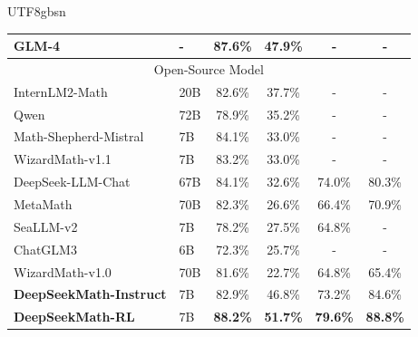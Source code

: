 \documentclass[11pt, a4paper, logo, copyright, nonumbering]{deepseek}
\newcommand{\spmath}{DeepSeekMath}
\begin{document}
\begin{CJK*}{UTF8}{gbsn}
\begin{table}[t!]
{\begin{tabular}{llcccc}
GLM-4 &           -            & 87.6\%                         & 47.9\%               &            -          &       -                                                          \\
\midrule
\multicolumn{6}{c}{Open-Source Model}                                                                                                                                           \\ 
\midrule
InternLM2-Math & 20B           & 82.6\%                         & 37.7\%          &           -      &             -                                                     \\
Qwen & 72B                     & 78.9\%                         & 35.2\%          &          -       &       -                                                         \\
Math-Shepherd-Mistral & 7B & 84.1\%                         & 33.0\%          &             -    &               -                                                     \\
WizardMath-v1.1 & 7B           & 83.2\%                         & 33.0\%          &            -     &               -                                                  \\
DeepSeek-LLM-Chat & 67B        & 84.1\%                         & 32.6\%               & 74.0\%               & 80.3\%                                                            \\
MetaMath & 70B                 & 82.3\%                         & 26.6\%          & 66.4\%          & 70.9\%                                                             \\
SeaLLM-v2 & 7B & 78.2\% & 27.5\% & 64.8\% & - \\
ChatGLM3 & 6B                  & 72.3\%                         & 25.7\%          &         -        &          -                                                      \\
WizardMath-v1.0 & 70B          & 81.6\%                         & 22.7\%          & 64.8\%          & 65.4\%                                                            \\ 
\midrule
\textbf{\spmath-Instruct} & 7B     & 82.9\%                         & 46.8\%          & 73.2\%          & 84.6\%                                                     \\
\textbf{\spmath-RL} & 7B           & \textbf{88.2\%}                & \textbf{51.7\%} & \textbf{79.6\%} & \textbf{88.8\%}                                        \\

\end{tabular}}
\end{table}
\end{CJK*}
\end{document}
